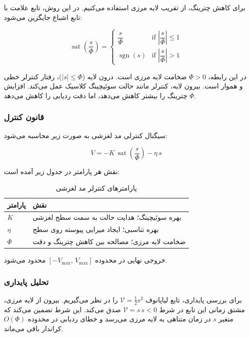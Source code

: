 برای کاهش چترینگ، از تقریب لایه مرزی استفاده می‌کنیم. در این روش، تابع علامت با تابع اشباع جایگزین می‌شود:

\begin{equation}
\operatorname{sat}\!\left(\frac{s}{\Phi}\right) =
\begin{cases}
\dfrac{s}{\Phi} & \text{if } \left|\dfrac{s}{\Phi}\right| \le 1 \\[8pt]
\operatorname{sgn}(s) & \text{if } \left|\dfrac{s}{\Phi}\right| > 1
\end{cases}
\end{equation}

در این رابطه، $\Phi > 0$ ضخامت لایه مرزی است. درون لایه ($|s| \le \Phi$)، رفتار کنترلر خطی و هموار است. بیرون لایه، کنترلر مانند حالت سوئیچینگ کلاسیک عمل می‌کند. افزایش $\Phi$ چترینگ را بیشتر کاهش می‌دهد، اما دقت ردیابی را کاهش می‌دهد.

\subsubsection{قانون کنترل}

سیگنال کنترلی مد لغزشی به صورت زیر محاسبه می‌شود:

\begin{equation}
V = -K\,\operatorname{sat}\!\left(\frac{s}{\Phi}\right) - \eta\, s
\end{equation}

نقش هر پارامتر در جدول زیر آمده است:

\begin{table}[H]
\centering
\caption{پارامترهای کنترلر مد لغزشی}
\begin{tabular}{ll}
\toprule
\textbf{پارامتر} & \textbf{نقش} \\
\midrule
$K$ & بهره سوئیچینگ؛ هدایت حالت به سمت سطح لغزشی \\
$\eta$ & بهره تناسبی؛ ایجاد میرایی پیوسته روی سطح \\
$\Phi$ & ضخامت لایه مرزی؛ مصالحه بین کاهش چترینگ و دقت \\
\bottomrule
\end{tabular}
\end{table}

خروجی نهایی در محدوده $[-V_{\max},\, V_{\max}]$ محدود می‌شود.

\subsubsection{تحلیل پایداری}

برای بررسی پایداری، تابع لیاپانوف $\mathcal{V} = \tfrac{1}{2}s^2$ را در نظر می‌گیریم. بیرون از لایه مرزی، مشتق زمانی این تابع در شرط $\dot{\mathcal{V}} = s\,\dot{s} < 0$ صدق می‌کند. این شرط تضمین می‌کند که متغیر $s$ در زمان متناهی به لایه مرزی می‌رسد و خطای ردیابی در محدوده $O(\Phi)$ کراندار باقی می‌ماند.


